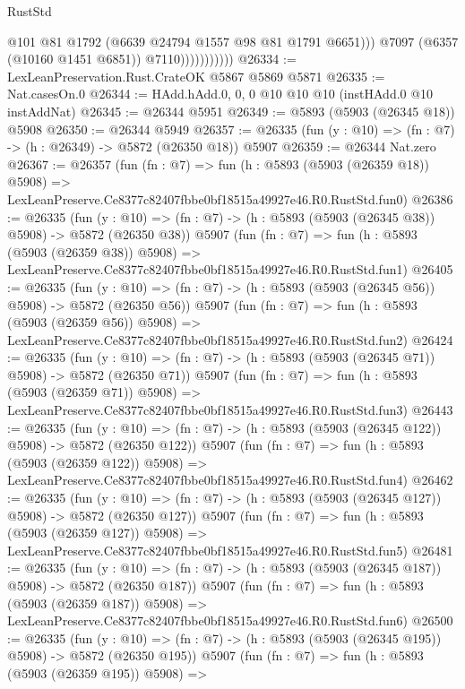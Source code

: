 \begin{lexlean}{RustStd}
\begin{coremodule}
                              @101
                              @81
                              @1792
                              (@6639 @24794 @1557 @98 @81 @1791 @6651)))
                          @7097
                          (@6357 (@10160 @1451 @6851))
                          @7110)))))))))))
@26334 := LexLeanPreservation.Rust.CrateOK @5867 @5869 @5871
@26335 := Nat.casesOn.{0}
@26344 := HAdd.hAdd.{0, 0, 0} @10 @10 @10 (instHAdd.{0} @10 instAddNat)
@26345 := @26344 @5951
@26349 := @5893 (@5903 (@26345 @18)) @5908
@26350 := @26344 @5949
@26357 := @26335 (fun (y : @10) => (fn : @7) -> (h : @26349) -> @5872 (@26350 @18)) @5907
@26359 := @26344 Nat.zero
@26367 := @26357
    (fun (fn : @7) =>
    fun (h : @5893 (@5903 (@26359 @18)) @5908) =>
    LexLeanPreserve.Ce8377c82407fbbe0bf18515a49927e46.R0.RustStd.fun0)
@26386 := @26335
    (fun (y : @10) => (fn : @7) -> (h : @5893 (@5903 (@26345 @38)) @5908) -> @5872 (@26350 @38))
    @5907
    (fun (fn : @7) =>
    fun (h : @5893 (@5903 (@26359 @38)) @5908) =>
    LexLeanPreserve.Ce8377c82407fbbe0bf18515a49927e46.R0.RustStd.fun1)
@26405 := @26335
    (fun (y : @10) => (fn : @7) -> (h : @5893 (@5903 (@26345 @56)) @5908) -> @5872 (@26350 @56))
    @5907
    (fun (fn : @7) =>
    fun (h : @5893 (@5903 (@26359 @56)) @5908) =>
    LexLeanPreserve.Ce8377c82407fbbe0bf18515a49927e46.R0.RustStd.fun2)
@26424 := @26335
    (fun (y : @10) => (fn : @7) -> (h : @5893 (@5903 (@26345 @71)) @5908) -> @5872 (@26350 @71))
    @5907
    (fun (fn : @7) =>
    fun (h : @5893 (@5903 (@26359 @71)) @5908) =>
    LexLeanPreserve.Ce8377c82407fbbe0bf18515a49927e46.R0.RustStd.fun3)
@26443 := @26335
    (fun (y : @10) => (fn : @7) -> (h : @5893 (@5903 (@26345 @122)) @5908) -> @5872 (@26350 @122))
    @5907
    (fun (fn : @7) =>
    fun (h : @5893 (@5903 (@26359 @122)) @5908) =>
    LexLeanPreserve.Ce8377c82407fbbe0bf18515a49927e46.R0.RustStd.fun4)
@26462 := @26335
    (fun (y : @10) => (fn : @7) -> (h : @5893 (@5903 (@26345 @127)) @5908) -> @5872 (@26350 @127))
    @5907
    (fun (fn : @7) =>
    fun (h : @5893 (@5903 (@26359 @127)) @5908) =>
    LexLeanPreserve.Ce8377c82407fbbe0bf18515a49927e46.R0.RustStd.fun5)
@26481 := @26335
    (fun (y : @10) => (fn : @7) -> (h : @5893 (@5903 (@26345 @187)) @5908) -> @5872 (@26350 @187))
    @5907
    (fun (fn : @7) =>
    fun (h : @5893 (@5903 (@26359 @187)) @5908) =>
    LexLeanPreserve.Ce8377c82407fbbe0bf18515a49927e46.R0.RustStd.fun6)
@26500 := @26335
    (fun (y : @10) => (fn : @7) -> (h : @5893 (@5903 (@26345 @195)) @5908) -> @5872 (@26350 @195))
    @5907
    (fun (fn : @7) =>
    fun (h : @5893 (@5903 (@26359 @195)) @5908) =>

\end{coremodule}
\end{lexlean}
